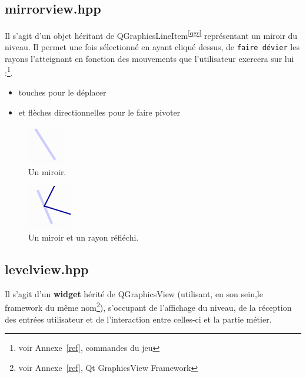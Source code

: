 \documentclass[a4paper,11pt]{report}
\begin{document}
\subsection[Le miroir]{mirrorview.hpp}
Il s'agit d'un objet héritant de QGraphicsLineItem\textsuperscript{\ref{qgs}} représentant un miroir du
niveau. Il permet une fois sélectionné en ayant cliqué dessus, de \texttt{faire
dévier} les rayons l'atteignant en fonction des mouvements que l'utilisateur exercera 
sur lui :\footnote{voir Annexe~\ref{ref}, commandes du jeu}.
\begin{itemize}
	\item touches pour le déplacer 
	\item et flèches directionnelles pour le faire pivoter
\end{itemize}

		\begin{figure}[h!]
			\caption{Un miroir.}
			\centering
			\includegraphics[keepaspectratio=true,width=0.2\linewidth]{./screenshots/elements_dyn/mirror}
		\end{figure}

		\begin{figure}[h!]
			\caption{Un miroir et un rayon réfléchi.}
			\centering
			\includegraphics[keepaspectratio=true,width=0.2\linewidth]{./screenshots/elements_dyn/mirror+ray}
		\end{figure}
		\newpage
\subsection[Le niveau]{levelview.hpp}
Il s'agit d'un \textbf{widget} hérité de QGraphicsView (utilisant, en son sein,le
framework du même nom\footnote{\label{qgv}voir Annexe~\ref{ref}, Qt GraphicsView
Framework}), s'occupant de l'affichage du niveau, de la réception
des entrées utilisateur et de l'interaction entre celles-ci et la partie
métier. 
\end{document}
